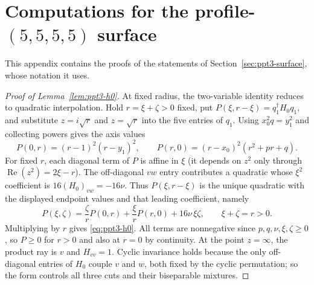 \section{\texorpdfstring{Computations for the profile-$(5,5,5,5)$ surface}{Computations for the profile-(5,5,5,5) surface}}\label{sec:ppt3-app-surface}

This appendix contains the proofs of the statements of Section~\ref{sec:ppt3-surface}, whose notation it uses.

\begin{proof}[Proof of Lemma~\ref{lem:ppt3-h0}]
At fixed radius, the two-variable identity reduces to quadratic interpolation. Hold $r=\xi+\zeta>0$ fixed, put
$P(\xi,r-\xi)=q_1^\dagger H_0q_1$, and substitute $z=i\sqrt r$
and $z=\sqrt r$ into the five entries of $q_1$.
Using $x_0^2q=y_1^2$ and collecting powers gives the axis values
\[
 P(0,r)=(r-1)^2(r-y_1)^2,\qquad
 P(r,0)=(r-x_0)^2(r^2+pr+q).
\]
For fixed $r$, each diagonal term of $P$ is affine in
$\xi$ (it depends on $z^2$ only through
$\operatorname{Re}(z^2)=2\xi-r$).
The off-diagonal $vw$ entry contributes a quadratic
whose $\xi^2$ coefficient is $16(H_0)_{vw}=-16\nu$.
Thus $P(\xi,r-\xi)$ is the unique quadratic with the displayed
endpoint values and that leading coefficient, namely
\[
 P(\xi,\zeta)=\frac{\zeta}{r}P(0,r)+\frac{\xi}{r}P(r,0)
       +16\nu\,\xi\zeta,\qquad \xi+\zeta=r>0.
\]
Multiplying by $r$ gives \eqref{eq:ppt3-h0}. All terms are nonnegative since $p,q,\nu,\xi,\zeta\ge0$,
so $P\ge0$ for $r>0$ and also at $r=0$ by continuity.
At the point $z=\infty$, the product ray is $v$ and
$H_{vv}=1$. Cyclic invariance holds because the only off-diagonal entries of $H_0$
couple $v$ and $w$, both fixed by the cyclic permutation; so the form controls
all three cuts and their biseparable mixtures.
\end{proof}

